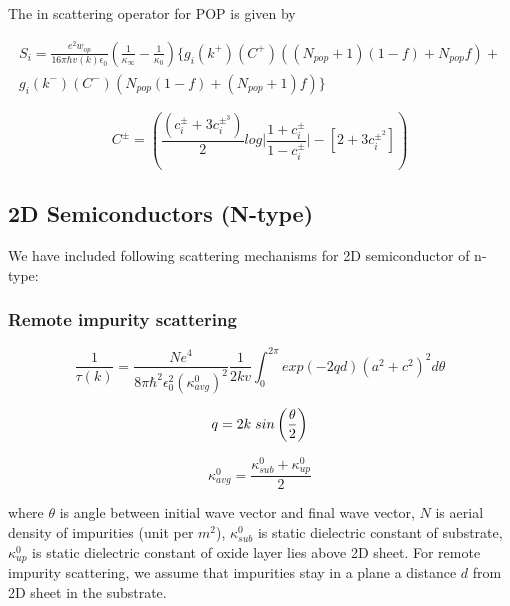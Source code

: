 \documentclass[12pt]{article}
\begin{document}
The in scattering operator for POP is given by \cite{ramu2011thermoelectric}

\begin{multline}
    S_i = \frac{e^2 w_{op}}{16\pi \hbar v(k) \epsilon_0}  \left( \frac{1}{\kappa_\infty} - \frac{1}{\kappa_0} \right) \{ g_i(k^+) (C^+)  \left( (N_{pop}+1)(1-f) + N_{pop} f \right) + \\ g_i(k^-) (C^-) \left( N_{pop}(1-f) + (N_{pop}+1) f \right) \}
\label{Si_p}
\end{multline}

\begin{equation}
C^{\pm} = \left( \frac{(c_i^{\pm}+3c_i^{\pm^3})}{2} log \Bigg|  \frac{1+c_i^{\pm}}{1-c_i^{\pm}}\Bigg|  - \left[ 2 + 3c_i^{\pm^2} \right] \right) 
\label{C_pm}
\end{equation}


\subsection{2D Semiconductors (N-type)}
We have included following scattering mechanisms for 2D semiconductor of n-type: 

\subsubsection{Remote impurity scattering}
\begin{equation}
\frac{1}{\tau(k)} = \frac{N e^4}{8 \pi \hbar^2 \epsilon_0^2 (\kappa_{avg}^{0})^2} \frac{1}{2kv} \int_0^{2\pi} exp(-2qd) (a^2 + c^2)^2 d\theta
    \label{ii_2d}
\end{equation}

\begin{equation}
q = 2 k \hspace{0.1cm} sin \left( \frac{\theta}{2} \right)
\label{change}
\end{equation}

\begin{equation}
\kappa_{avg}^0 = \frac{\kappa_{sub}^0 + \kappa_{up}^0}{2} 
\end{equation}

where $\theta $ is angle between initial wave vector and final wave vector, $N$ is aerial density of impurities (unit per $m^2$),   $\kappa_{sub}^0$ is static dielectric constant of substrate, $\kappa_{up}^0$ is static dielectric constant of oxide layer lies above 2D sheet. For remote impurity scattering, we assume that impurities stay in a plane a distance $d$ from 2D sheet in the substrate.
\end{document}
